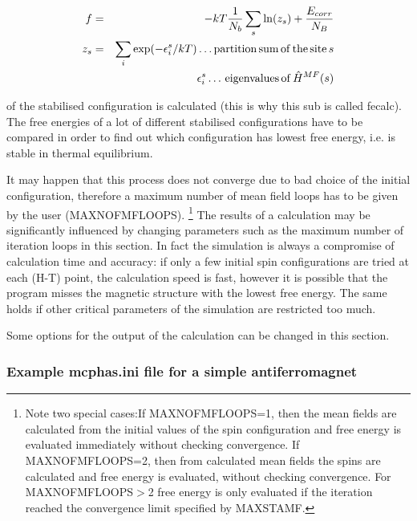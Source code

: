 \begin{description}
\begin{eqnarray}\label{freeenergy}
f&=&-kT\frac{1}{N_b}\sum_s \ln(z_s) + \frac{E_{corr}}{N_B} \\
  z_s&=&\sum_i \exp(-\epsilon^s_i/kT) \, {\rm \dots  partition \, sum \, of \, the \, site} \, s  \\
&&\epsilon_i^s \, {\rm  \dots  \, eigenvalues \, of \, }\hat H^{MF}(s) \nonumber
\end{eqnarray}

of the stabilised
configuration is calculated (this is why this sub is called {\prg fecalc}). 
The free energies of a lot of different stabilised configurations have to
be compared in order to find out which configuration has lowest free energy, i.e.
is stable in thermal  equilibrium.

It may happen that this process does
not converge due to bad choice of the initial configuration, therefore a maximum number
of mean field loops has to be given by the user (MAXNOFMFLOOPS). \footnote{Note two
special cases:If MAXNOFMFLOOPS=1, then the mean fields are calculated from the initial values
of the spin configuration and free energy is evaluated immediately without checking convergence.
If MAXNOFMFLOOPS=2, then from calculated mean fields the spins are calculated and 
free energy is evaluated, without checking convergence. For  MAXNOFMFLOOPS$>$2 free energy is
only evaluated if the iteration reached the convergence limit specified by MAXSTAMF.}
The results of a calculation may be significantly influenced by
changing parameters such as the maximum number of iteration loops 
in this section. 
In fact the simulation is always a compromise of calculation time and accuracy: if only
a few initial spin configurations are tried at each (H-T) point, the calculation speed is
fast, however it is possible that the program misses the magnetic structure with the
lowest free energy. The same holds if other critical parameters of the simulation are
restricted too much.
 

\item [OUTPUT OF PHYSICAL PROPERTIES:]
Some options for the output of the calculation can be changed in this section.
\end{description}


 
\subsubsection{Example {\prg mcphas.ini} file for a simple antiferromagnet}

